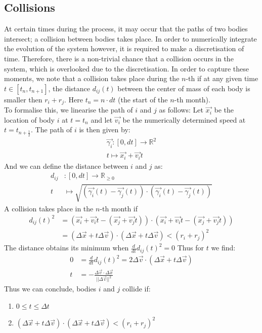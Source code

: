 \subsection{Collisions}
At certain times during the process, it may occur that the paths of two bodies intersect; a collision between bodies takes place. In order to numerically integrate the evolution of the system however, it is required to make a discretisation of time.
 Therefore, there is a non-trivial chance that a collision occurs in the system, which is overlooked due to the discretisation.
 In order to capture these moments, we note that a collision takes place during the \(n\)-th if at any given time \(t\in[t_{n},t_{n+1}]\), the distance \(d_{ij}(t)\) between the center of mass of each body is smaller then \(r_i+r_j\). 
 Here \(t_n=n\cdot dt\) (the start of the \(n\)-th month).
\\
 To formalise this, we linearise the path of \(i\) and \(j\) as follows: 
 Let \(\vec{x_i}\) be the location of body \(i\) at \(t=t_n\) and let \(\vec{v_i}\) be the numerically determined speed at \(t=t_{n+\frac{1}{2}}\).
The path of \(i\) is then given by:
\begin{align*}
\vec{\gamma_i}:[0,dt]\rightarrow\mathbb{R}^2 \\
t\mapsto \vec{x_i}+\vec{v_i}t
\end{align*}
And we can define the distance between \(i\) and \(j\) as:
\begin{align*}
	d_{ij}&:[0,dt]\rightarrow \mathbb{R}_{\geq 0}\\
	t&\mapsto \sqrt{(\vec{\gamma_i}(t)-\vec{\gamma_j}(t))\cdot(\vec{\gamma_i}(t)-\vec{\gamma_j}(t))}
\end{align*}
 A collision takes place in the \(n\)-th month if 
 \begin{align*}
	d_{ij}(t)^2&=(\vec{x_i}+\vec{v_i}t-(\vec{x_j}+\vec{v_j}t))\cdot (\vec{x_i}+\vec{v_i}t-(\vec{x_j}+\vec{v_j}t))\\
	&= (\Delta\vec{x} +t\Delta\vec{v})\cdot(\Delta\vec{x} +t\Delta\vec{v})<(r_i+r_j)^2
 \end{align*}
  The distance obtains its minimum when \(\frac{d}{dt}d_{ij}(t)^2=0\) Thus for \(t\) we find:
  \begin{align*}
  0&=\frac{d}{dt}d_{ij}(t)^2 =2\Delta\vec{v}\cdot(\Delta\vec{x}+t\Delta\vec{v})\\
  t&=-\frac{\Delta\vec{v}\cdot \Delta\vec{x}}{||\Delta \vec{v}||^2}
  \end{align*}
  Thus we can conclude, bodies \(i\) and \(j\) collide if:
 \begin{enumerate}
  \item \(0\leq t \leq \Delta t\) 
  \item \((\Delta\vec{x} +t\Delta\vec{v})\cdot(\Delta\vec{x} +t\Delta\vec{v}) <(r_i+r_j)^2\)
\end{enumerate} 
